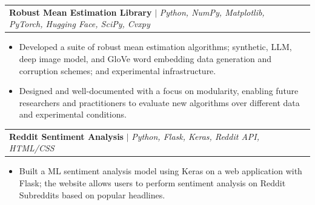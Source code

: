 \documentclass[letterpaper,10.8pt]{article}
\makeatletter
\newcommand{\resumeItem}[1]{
  \item\small{
    {#1 \vspace{-2pt}}
  }
}
\newcommand{\resumeProjectHeading}[2]{
    \item
    \begin{tabular*}{0.97\textwidth}{l@{\extracolsep{\fill}}r}
      \small#1 & #2 \\
    \end{tabular*}\vspace{-7pt}
}
\newcommand{\resumeItemListStart}{\begin{itemize}}
\newcommand{\resumeItemListEnd}{\end{itemize}\vspace{-5pt}}
\makeatother
\begin{document}
        \resumeProjectHeading
          {\textbf{Robust Mean Estimation Library} $|$ \emph{Python, NumPy, Matplotlib, PyTorch, Hugging Face, SciPy, Cvxpy}}{}
          \resumeItemListStart
            \resumeItem{Developed a suite of robust mean estimation algorithms; synthetic, LLM, deep image model, and GloVe word embedding data generation and corruption schemes; and experimental infrastructure.}
            \resumeItem{Designed and well-documented with a focus on modularity, enabling future researchers and practitioners to evaluate new algorithms over different data and experimental conditions.}
          \resumeItemListEnd
    
        \resumeProjectHeading
          {\textbf{Reddit Sentiment Analysis} $|$ \emph{Python, Flask, Keras, Reddit API, HTML/CSS}}{}
          \resumeItemListStart
            \resumeItem{Built a ML sentiment analysis model using Keras on a web application with Flask; the website allows users to perform sentiment analysis on Reddit Subreddits based on popular headlines.}
          \resumeItemListEnd

          
        
              
\end{document}
